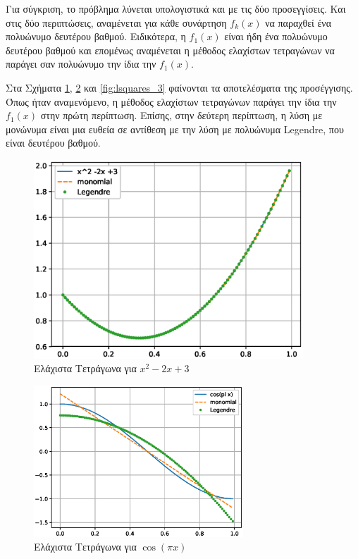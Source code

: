 \documentclass[assignment3.tex]{subfiles}
\begin{document}
Για σύγκριση, το πρόβλημα λύνεται υπολογιστικά και με τις δύο προσεγγίσεις. Και στις δύο περιπτώσεις, αναμένεται για κάθε συνάρτηση $f_k(x)$ να παραχθεί ένα πολυώνυμο δευτέρου βαθμού. Ειδικότερα, η $f_1(x)$ είναι ήδη ένα πολυώνυμο δευτέρου βαθμού και επομένως αναμένεται η μέθοδος ελαχίστων τετραγώνων να παράγει σαν πολυώνυμο την ίδια την $f_1(x)$.

Στα Σχήματα \ref{fig:lsquares_1}, \ref{fig:lsquares_2} και \ref{fig:lsquares_3} φαίνονται τα αποτελέσματα της προσέγγισης. Όπως ήταν αναμενόμενο, η μέθοδος ελαχίστων τετραγώνων παράγει την ίδια την $f_1(x)$ στην πρώτη περίπτωση. Επίσης, στην δεύτερη περίπτωση, η λύση με μονώνυμα είναι μια ευθεία σε αντίθεση με την λύση με πολυώνυμα \textlatin{Legendre}, που είναι δευτέρου βαθμού.

\begin{figure}[hp]
\includegraphics[width=0.9\textwidth]{lsquares_1.eps}
\centering
\caption{Ελάχιστα Τετράγωνα για $x^2-2x+3$}
\label{fig:lsquares_1}
\end{figure}

\begin{figure}[hp]
\includegraphics[width=0.7\textwidth]{lsquares_2.eps}
\centering
\caption{Ελάχιστα Τετράγωνα για $\cos(\pi x)$}
\label{fig:lsquares_2}
\end{figure}
\end{document}
